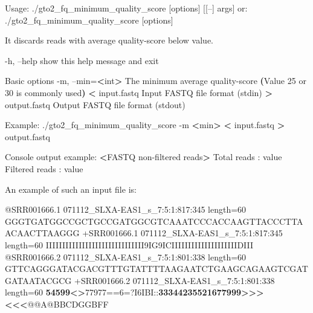 \documentclass[11pt,]{krantz}
\newenvironment{Shaded}{\begin{snugshade}}{\end{snugshade}}
\newcommand{\KeywordTok}[1]{\textcolor[rgb]{0.27,0.27,0.27}{\textbf{#1}}}
\newcommand{\OperatorTok}[1]{\textcolor[rgb]{0.43,0.43,0.43}{\textbf{#1}}}
\newcommand{\ExtensionTok}[1]{#1}
\newcommand{\NormalTok}[1]{#1}
\begin{document}
\begin{Shaded}
\begin{Highlighting}[]
\ExtensionTok{Usage}\NormalTok{: ./gto2_fq_minimum_quality_score [options] [[--] args]}
   \ExtensionTok{or}\NormalTok{: ./gto2_fq_minimum_quality_score [options]}

\ExtensionTok{It}\NormalTok{ discards reads with average quality-score below value.}

    \ExtensionTok{-h}\NormalTok{, --help            show this help message and exit}

\ExtensionTok{Basic}\NormalTok{ options}
    \ExtensionTok{-m}\NormalTok{, --min=}\OperatorTok{<}\NormalTok{int}\OperatorTok{>}\NormalTok{       The minimum average quality-score }
                          \KeywordTok{(}\ExtensionTok{Value}\NormalTok{ 25 or 30 is commonly used}\KeywordTok{)}
    \OperatorTok{<} \ExtensionTok{input.fastq}\NormalTok{         Input FASTQ file format (stdin)}
    \OperatorTok{>} \ExtensionTok{output.fastq}\NormalTok{        Output FASTQ file format (stdout)}

\ExtensionTok{Example}\NormalTok{: ./gto2_fq_minimum_quality_score -m }\OperatorTok{<}\NormalTok{min}\OperatorTok{>} \OperatorTok{<} 
\ExtensionTok{input.fastq} \OperatorTok{>}\NormalTok{ output.fastq}

\ExtensionTok{Console}\NormalTok{ output example:}
\OperatorTok{<}\ExtensionTok{FASTQ}\NormalTok{ non-filtered reads}\OperatorTok{>}
\ExtensionTok{Total}\NormalTok{ reads    : value}
\ExtensionTok{Filtered}\NormalTok{ reads : value}
\end{Highlighting}
\end{Shaded}

An example of such an input file is:

\begin{Shaded}
\begin{Highlighting}[]
\ExtensionTok{@SRR001666.1}\NormalTok{ 071112_SLXA-EAS1_s_7:5:1:817:345 length=60}
\ExtensionTok{GGGTGATGGCCGCTGCCGATGGCGTCAAATCCCACCAAGTTACCCTTAACAACTTAAGGG}
\ExtensionTok{+SRR001666.1}\NormalTok{ 071112_SLXA-EAS1_s_7:5:1:817:345 length=60}
\ExtensionTok{IIIIIIIIIIIIIIIIIIIIIIIIIIIIII9IG9ICIIIIIIIIIIIIIIIIIIIIDIII}
\ExtensionTok{@SRR001666.2}\NormalTok{ 071112_SLXA-EAS1_s_7:5:1:801:338 length=60}
\ExtensionTok{GTTCAGGGATACGACGTTTGTATTTTAAGAATCTGAAGCAGAAGTCGATGATAATACGCG}
\ExtensionTok{+SRR001666.2}\NormalTok{ 071112_SLXA-EAS1_s_7:5:1:801:338 length=60}
\OperatorTok{54599<>}\ExtensionTok{77977}\NormalTok{==6=?I6IBI::}\OperatorTok{33344235521677999>>><<<}\NormalTok{@@A@BBCDGGBFF}
\end{Highlighting}
\end{Shaded}
\end{document}
